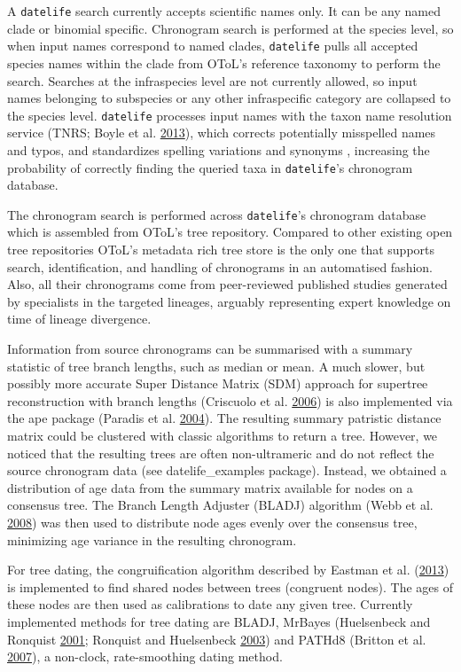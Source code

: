 \documentclass[]{article}
\begin{document}
A \texttt{datelife} search currently accepts scientific names only. It can be any named clade or binomial specific.
Chronogram search is performed at the species level, so when input names correspond
to named clades, \texttt{datelife} pulls all accepted species names within the
clade from OToL's reference taxonomy to perform the search.
Searches at the infraspecies level are not currently allowed, so input names belonging to subspecies or any other infraspecific category are collapsed to the species level.
\texttt{datelife} processes input names with the taxon name resolution service (TNRS; Boyle et al. \protect\hyperlink{ref-Boyle2013}{2013}),
which corrects potentially misspelled names and typos, and standardizes spelling
variations and synonyms , increasing the probability of correctly finding the
queried taxa in \texttt{datelife}'s chronogram database.

The chronogram search is performed across \texttt{datelife}'s chronogram database which is assembled from OToL's tree repository. Compared to other existing open tree repositories OToL's metadata rich tree store is the only one that supports search, identification, and handling of chronograms in an automatised fashion. Also, all their chronograms come from peer-reviewed published studies generated by specialists in the targeted lineages, arguably representing expert knowledge on time of lineage divergence.

Information from source chronograms can be summarised with a summary statistic of tree branch lengths, such as median or mean. A much slower, but possibly more accurate Super Distance Matrix (SDM) approach for supertree reconstruction with branch lengths (Criscuolo et al. \protect\hyperlink{ref-Criscuolo2006}{2006}) is also implemented via the ape package (Paradis et al. \protect\hyperlink{ref-Paradis2004}{2004}).
The resulting summary patristic distance matrix could be clustered with classic algorithms to return a tree. However, we noticed that the resulting trees are often non-ultrameric and do not reflect the source chronogram data (see datelife\_examples package). Instead, we obtained a distribution of age data from the summary matrix available for nodes on a consensus tree. The Branch Length Adjuster (BLADJ) algorithm (Webb et al. \protect\hyperlink{ref-Webb2008}{2008}) was then used to distribute node ages evenly over the consensus tree, minimizing age variance in the resulting chronogram.

For tree dating, the congruification algorithm described by Eastman et al. (\protect\hyperlink{ref-Eastman2013}{2013})
is implemented to find shared nodes between trees (congruent nodes). The ages of these nodes are then used as calibrations to date any given tree. Currently implemented methods for tree dating are BLADJ, MrBayes (Huelsenbeck and Ronquist \protect\hyperlink{ref-Huelsenbeck2001}{2001}; Ronquist and Huelsenbeck \protect\hyperlink{ref-Ronquist2003}{2003}) and PATHd8 (Britton et al. \protect\hyperlink{ref-Britton2007}{2007}), a non-clock, rate-smoothing dating method.
\end{document}
